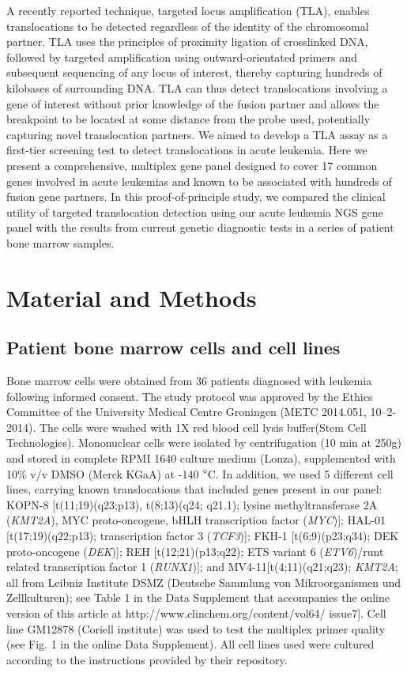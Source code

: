 A recently reported technique, targeted locus amplification (TLA), enables translocations to be detected regardless of the identity of the chromosomal partner\cite{de_Vree_2014}. 
TLA uses the principles of proximity ligation of crosslinked DNA, followed by targeted amplification using outward-orientated primers and subsequent sequencing of any locus of interest, thereby capturing hundreds of kilobases of surrounding DNA\cite{de_Vree_2014}.
TLA can thus detect translocations involving a gene of interest without prior knowledge of the fusion partner and allows the breakpoint to be located at some distance from the probe used, potentially capturing novel translocation partners. 
We aimed to develop a TLA assay as a first-tier screening test to detect translocations in acute leukemia. 
Here we present a comprehensive, multiplex gene panel designed to cover 17 common genes involved in acute leukemias and known to be associated with hundreds of fusion gene partners. 
In this proof-of-principle study, we compared the clinical utility of targeted translocation detection using our acute leukemia NGS gene panel with the results from current genetic diagnostic tests in a series of patient bone marrow samples.


\section{Material and Methods}\label{Material and Methods}

\subsection{Patient bone marrow cells and cell lines}
Bone marrow cells were obtained from 36 patients diagnosed with leukemia following informed consent.
The study protocol was approved by the Ethics Committee of the University Medical Centre Groningen (METC 2014.051, 10–2-2014). 
The cells were washed with 1X red blood cell lysis buffer(Stem Cell Technologies). 
Mononuclear cells were isolated by centrifugation (10 min at 250g) and stored in complete RPMI 1640 culture medium (Lonza), supplemented with 10\% v/v DMSO (Merck KGaA) at -140 $\degree$C. In addition, we used 5 different cell lines, carrying known translocations that included genes present in our panel: KOPN-8 [t(11;19)(q23;p13), t(8;13)(q24; q21.1); lysine methyltransferase 2A (\textsl{KMT2A}), MYC proto-oncogene, bHLH transcription factor (\textsl{MYC})]; HAL-01 [t(17;19)(q22;p13); transcription factor 3 (\textsl{TCF3})]; FKH-1 [t(6;9)(p23;q34); DEK proto-oncogene (\textsl{DEK})]; REH [t(12;21)(p13;q22); ETS variant 6 (\textsl{ETV6})/runt related transcription factor 1 (\textsl{RUNX1})]; and MV4-11[t(4;11)(q21;q23); \textsl{KMT2A}; all from Leibniz Institute DSMZ (Deutsche Sammlung von Mikroorganismen und Zellkulturen); see Table 1 in the Data Supplement that accompanies the online version of this article at http://www.clinchem.org/content/vol64/ issue7]. 
Cell line GM12878 (Coriell institute) was used to test the multiplex primer quality (see Fig. 1 in the online Data Supplement). 
All cell lines used were cultured according to the instructions provided by their repository.

